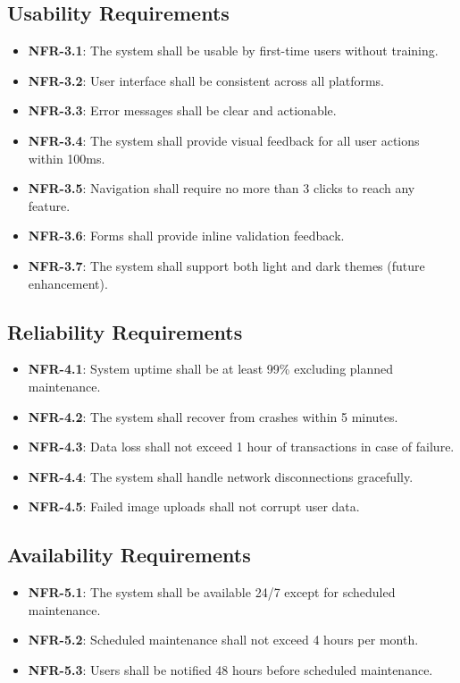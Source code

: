 \documentclass[12pt,a4paper]{article}
\begin{document}
\subsection{Usability Requirements}
\begin{itemize}
    \item \textbf{NFR-3.1}: The system shall be usable by first-time users without training.
    \item \textbf{NFR-3.2}: User interface shall be consistent across all platforms.
    \item \textbf{NFR-3.3}: Error messages shall be clear and actionable.
    \item \textbf{NFR-3.4}: The system shall provide visual feedback for all user actions within 100ms.
    \item \textbf{NFR-3.5}: Navigation shall require no more than 3 clicks to reach any feature.
    \item \textbf{NFR-3.6}: Forms shall provide inline validation feedback.
    \item \textbf{NFR-3.7}: The system shall support both light and dark themes (future enhancement).
\end{itemize}

\subsection{Reliability Requirements}
\begin{itemize}
    \item \textbf{NFR-4.1}: System uptime shall be at least 99\% excluding planned maintenance.
    \item \textbf{NFR-4.2}: The system shall recover from crashes within 5 minutes.
    \item \textbf{NFR-4.3}: Data loss shall not exceed 1 hour of transactions in case of failure.
    \item \textbf{NFR-4.4}: The system shall handle network disconnections gracefully.
    \item \textbf{NFR-4.5}: Failed image uploads shall not corrupt user data.
\end{itemize}

\subsection{Availability Requirements}
\begin{itemize}
    \item \textbf{NFR-5.1}: The system shall be available 24/7 except for scheduled maintenance.
    \item \textbf{NFR-5.2}: Scheduled maintenance shall not exceed 4 hours per month.
    \item \textbf{NFR-5.3}: Users shall be notified 48 hours before scheduled maintenance.
\end{itemize}
\end{document}
